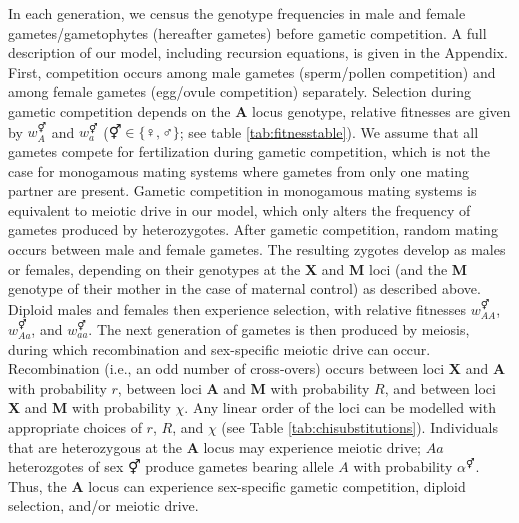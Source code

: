 \documentclass[12pt]{article}
\begin{document}
In each generation, we census the genotype frequencies in male and female gametes/gametophytes (hereafter gametes) before gametic competition. 
A full description of our model, including recursion equations, is given in the Appendix. 
First, competition occurs among male gametes (sperm/pollen competition) and among female gametes (egg/ovule competition) separately. 
Selection during gametic competition depends on the \textbf{A} locus genotype, relative fitnesses are given by $w_A^\Hermaphrodite$ and $w_a^\Hermaphrodite$ ($\Hermaphrodite \in \{\female,\male\}$; see table \ref{tab:fitnesstable}). %
We assume that all gametes compete for fertilization during gametic competition, which is not the case for monogamous mating systems where gametes from only one mating partner are present. 
Gametic competition in monogamous mating systems is equivalent to meiotic drive in our model, which only alters the frequency of gametes produced by heterozygotes. 
After gametic competition, random mating occurs between male and female gametes.
The resulting zygotes develop as males or females, depending on their genotypes at the \textbf{X} and \textbf{M} loci (and the \textbf{M} genotype of their mother in the case of maternal control) as described above.
Diploid males and females then experience selection, with relative fitnesses $w_{AA}^{\Hermaphrodite}$, $w_{Aa}^{\Hermaphrodite}$, and $w_{aa}^{\Hermaphrodite}$. %
The next generation of gametes is then produced by meiosis, during which recombination and sex-specific meiotic drive can occur. 
Recombination (i.e., an odd number of cross-overs) occurs between loci \textbf{X} and \textbf{A} with probability $r$, between loci \textbf{A} and \textbf{M} with probability $R$, and between loci \textbf{X} and \textbf{M} with probability $\chi$.
Any linear order of the loci can be modelled with appropriate choices of $r$, $R$, and $\chi$ (see Table \ref{tab:chisubstitutions}). 
Individuals that are heterozygous at the \textbf{A} locus may experience meiotic drive; $Aa$ heterozgotes of sex $\Hermaphrodite$ produce gametes bearing allele $A$ with probability $\alpha^\Hermaphrodite$. 
Thus, the \textbf{A} locus can experience sex-specific gametic competition, diploid selection, and/or meiotic drive. 
\end{document}
